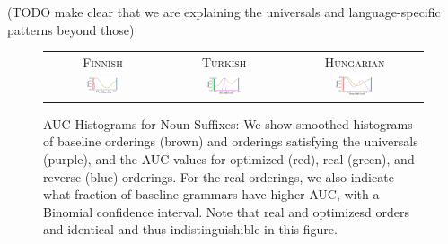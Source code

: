 \documentclass[11pt,letterpaper]{article}
\newcommand\mhahn[1]{{\color{red}(#1)}}
\newcommand\becky[1]{{\color{blue}(#1)}}
\begin{document}


\mhahn{TODO make clear that we are explaining the universals and language-specific patterns beyond those}





\begin{figure}
\begin{tabular}{ccc}
\textsc{Finnish} & \textsc{Turkish} & \textsc{Hungarian} \\
    \includegraphics[width=0.3\textwidth]{figures/finnish_nouns/suffixes-byMorphemes-auc-hist-heldout-Coarse-FineSurprisal-optimized.pdf}
    &
    \includegraphics[width=0.3\textwidth]{figures/turkish_nouns/suffixes-byMorphemes-auc-hist-heldout-Coarse-FineSurprisal-optimized.pdf}
    &
    \includegraphics[width=0.3\textwidth]{figures/hungarian_nouns/suffixes-byMorphemes-auc-hist-heldout-Coarse-FineSurprisal-optimized.pdf}
    \end{tabular}
    \caption{AUC Histograms for Noun Suffixes: We show smoothed histograms of baseline orderings (brown) and orderings satisfying the universals (purple), and the AUC values for optimized (red), real (green), and reverse (blue) orderings. For the real orderings, we also indicate what fraction of baseline grammars have higher AUC, with a Binomial confidence interval. Note that real and optimizesd orders and identical and thus indistinguishible in this figure. }
    \label{fig:auc_nouns}
\end{figure}
\end{document}
